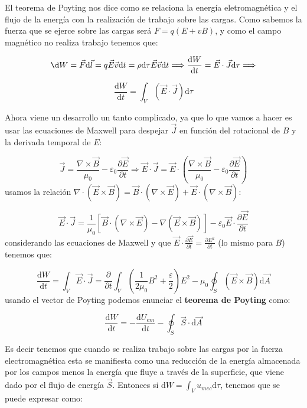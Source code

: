 \documentclass[12pt,a4paper]{article}
\newcommand{\parentesis}[1]{\left( #1  \right)}
\newcommand{\parciales}[2]{\frac{\partial #1}{\partial #2}}
\newcommand{\D}{\mathrm{d}}
\begin{document}
El teorema de Poyting nos dice como se relaciona la energía eletromagnética y el flujo de la energía con la realización de trabajo sobre las cargas. Como sabemos la fuerza que se ejerce sobre las cargas será $F = q(E+vB)$, y como el campo magnético no realiza trabajo tenemos que:

$$ \d W = \vec{F} \D \vec{l} = q \vec{E} \vec{v} \D t = \rho \D \tau \vec{E}  \vec{v} \D t  \Longrightarrow \dfrac{\D W}{\D t} = \vec{E} \cdot \vec{J} \D \tau \Longrightarrow$$

\begin{equation}
\dfrac{\D W}{\D t} = \int_V (\vec{E} \cdot \vec{J}) \D \tau \label{Ec:6.3.Trabajo}
\end{equation}

Ahora viene un desarrollo un tanto complicado, ya que lo que vamos a hacer es usar las ecuaciones de Maxwell para despejar $\vec{J}$ en función del rotacional de $B$ y la derivada temporal de $E$:

$$ \vec{J} = \dfrac{\nabla \times \vec{B}}{\mu_0} - \varepsilon_0 \parciales{\vec{E}}{t} \Longrightarrow \vec{E} \cdot \vec{J} = \vec{E} \cdot \parentesis{\dfrac{\nabla \times \vec{B}}{\mu_0} - \varepsilon_0 \parciales{\vec{E}}{t} }  $$
usamos la relación $\nabla \cdot (\vec{E} \times \vec{B}) = \vec{B} \cdot (\nabla \times \vec{E}) +  \vec{E} \cdot (\nabla \times \vec{B})$:

$$ \vec{E} \cdot \vec{J} = \dfrac{1}{\mu_0} \left[ \vec{B} \cdot (\nabla \times \vec{E}) -  \nabla (\vec{E} \times \vec{B}) \right] - \varepsilon_0 \vec{E} \cdot \parciales{\vec{E}}{t} $$
considerando las ecuaciones de Maxwell y que $\vec{E} \cdot \parciales{\vec{E}}{t}  = \parciales{E^2}{t}$ (lo mismo para $B$) tenemos que:

$$ \dfrac{\D W}{\D t} = \int_V \vec{E} \cdot \vec{J} = \parciales{}{t} \int_V \parentesis{\dfrac{1}{2 \mu_0} B^2 +  \dfrac{\varepsilon}{2}} E^2  - \mu_0 \oint_S (\vec{E} \times \vec{B}) \D \vec{A} $$
usando el vector de Poyting podemos enunciar el \textbf{teorema de Poyting} como:

\begin{equation}
\dfrac{\D W}{\D t} = - \dfrac{\D U_{em}}{\D t} - \oint_S \vec{S} \cdot \D \vec{A}
\end{equation} 

Es decir tenemos que cuando se realiza trabajo sobre las cargas por la fuerza electromagnética esta se manifiesta como una reducción de la energía almacenada por los campos menos la energía que fluye a través de la superficie, que viene dado por el flujo de energía $\vec{S}$. Entonces si $\D W = \int_V u_{mec} \D \tau$, tenemos que se puede expresar como:
\end{document}
